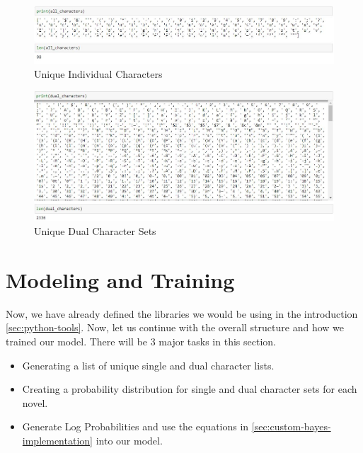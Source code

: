 \begin{figure}[H]
	\begin{center}
		\includegraphics[width = 1.0\textwidth]{Images/single_chars.JPG} %
		\caption{Unique Individual Characters}
		\label{fig:single-chars-all}
	\end{center}
\end{figure}

\begin{figure}[H]
	\begin{center}
		\includegraphics[width = 1.0\textwidth]{Images/dual_chars.JPG} %
		\caption{Unique Dual Character Sets}
		\label{fig:dual-chars-all}
	\end{center}
\end{figure}


\section{Modeling and Training}
\label{sec:modeling}

Now, we have already defined the libraries we would be using in the introduction \ref{sec:python-tools}. Now, let us continue with the overall structure and how we trained our model.
There will be 3 major tasks in this section.

\begin{itemize}
    \item Generating a list of unique single and dual character lists.
    \item Creating a probability distribution for single and dual character sets for each novel.
    \item Generate Log Probabilities and use the equations in \ref{sec:custom-bayes-implementation} into our model.
\end{itemize}
\vspace{0.5cm}

